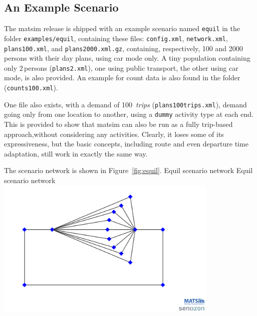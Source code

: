 \subsection{An Example Scenario}
The \gls{matsim} release is shipped with an example scenario named \lstinline|equil| in the folder \lstinline|examples/equil|, containing these files: \lstinline|config.xml|, \lstinline|network.xml|, \lstinline|plans100.xml|, and \lstinline|plans2000.xml.gz|, containing, respectively, 100 and 2000\,persons with their day plans, using car mode only. A tiny population containing only 2\,persons (\lstinline|plans2.xml|), one using public transport, the other using car mode, is also provided. An example for count data is also found in the folder (\lstinline|counts100.xml|). 



One file also exists, with a demand of 
100~\emph{trips} (\lstinline|plans100trips.xml|), \ie demand going only from one location to another, using a \lstinline$dummy$ activity type at each end.  This is provided to show that \gls{matsim} can also be run as a fully trip-based approach,without considering any activities. Clearly, it loses some of its expressiveness, but the basic concepts, including route and even departure time adaptation, still work in exactly the same way.

The scenario network is shown in Figure~\ref{fig:equil}.
%
\createfigure%
{Equil scenario network}%
{Equil scenario network}%
{\label{fig:equil}}%
{\includegraphics[width=0.8\textwidth, angle=0]{using/figures/equil.png}}%
{}

